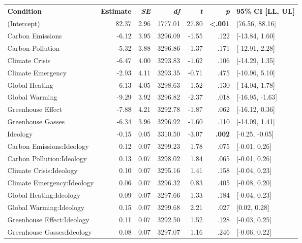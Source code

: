 \begin{table}[ht]
\centering
\begin{tabular}{lrrrrrl}
  \hline
Condition & Estimate & \textit{SE} & \textit{df} & \textit{t} & \textit{p} & 95\% CI [LL, UL] \\ 
  \hline
(Intercept) & 82.37 & 2.96 & 1777.01 & 27.80 & \textbf{\textless  .001} & [76.56, 88.16] \\ 
  Carbon Emissions & -6.12 & 3.95 & 3296.09 & -1.55 & .122 & [-13.84, 1.60] \\ 
  Carbon Pollution & -5.32 & 3.88 & 3296.86 & -1.37 & .171 & [-12.91, 2.28] \\ 
  Climate Crisis & -6.47 & 4.00 & 3293.83 & -1.62 & .106 & [-14.29, 1.35] \\ 
  Climate Emergency & -2.93 & 4.11 & 3293.35 & -0.71 & .475 & [-10.96, 5.10] \\ 
  Global Heating & -6.13 & 4.05 & 3298.63 & -1.52 & .130 & [-14.04, 1.78] \\ 
  Global Warming & -9.29 & 3.92 & 3296.82 & -2.37 & .018 & [-16.95, -1.63] \\ 
  Greenhouse Effect & -7.88 & 4.21 & 3292.78 & -1.87 & .062 & [-16.12, 0.36] \\ 
  Greenhouse Gasses & -6.34 & 3.96 & 3296.92 & -1.60 & .110 & [-14.09, 1.41] \\ 
  Ideology & -0.15 & 0.05 & 3310.50 & -3.07 & \textbf{.002} & [-0.25, -0.05] \\ 
  Carbon Emissions:Ideology & 0.12 & 0.07 & 3299.23 & 1.78 & .075 & [-0.01, 0.26] \\ 
  Carbon Pollution:Ideology & 0.13 & 0.07 & 3298.02 & 1.84 & .065 & [-0.01, 0.26] \\ 
  Climate Crisis:Ideology & 0.10 & 0.07 & 3295.16 & 1.41 & .158 & [-0.04, 0.23] \\ 
  Climate Emergency:Ideology & 0.06 & 0.07 & 3296.32 & 0.83 & .405 & [-0.08, 0.20] \\ 
  Global Heating:Ideology & 0.09 & 0.07 & 3297.66 & 1.33 & .184 & [-0.04, 0.23] \\ 
  Global Warming:Ideology & 0.15 & 0.07 & 3299.68 & 2.21 & .027 & [0.02, 0.28] \\ 
  Greenhouse Effect:Ideology & 0.11 & 0.07 & 3292.50 & 1.52 & .128 & [-0.03, 0.25] \\ 
  Greenhouse Gasses:Ideology & 0.08 & 0.07 & 3297.07 & 1.16 & .246 & [-0.06, 0.22] \\ 
   \hline
\end{tabular}
\end{table}

